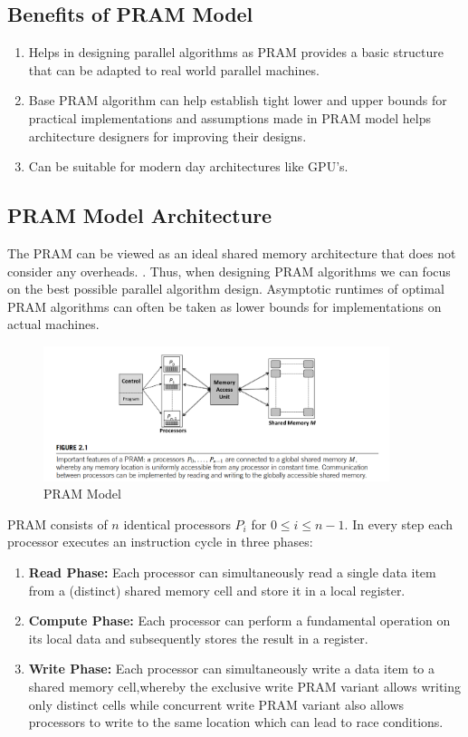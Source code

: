 \subsection*{Benefits of PRAM Model}
\begin{enumerate}
    \item Helps in designing parallel algorithms as PRAM provides a basic structure that can be adapted to real world parallel machines.
    \item Base PRAM algorithm can help establish tight lower and upper bounds for practical implementations and assumptions made in PRAM model helps architecture designers for improving their designs.
    \item Can be suitable for modern day architectures like GPU's.
\end{enumerate}

\newpage

\subsection*{PRAM Model Architecture}
The PRAM can be viewed as an ideal shared memory architecture that does not consider any overheads. . Thus, when designing PRAM algorithms we can focus on the best possible parallel algorithm design. Asymptotic runtimes of optimal PRAM algorithms can often be 
taken as lower bounds for implementations on actual machines.

\begin{figure}[h]
    \centering
    \includegraphics[width=0.9\textwidth]{Images/PRAM.png}
    \caption{PRAM Model}
\end{figure}

PRAM consists of $n$ identical processors $P_i$ for $0 \leq i \leq n-1$. In every step each processor executes an instruction cycle in three phases:
\begin{enumerate}
    \item \textbf{Read Phase:} Each processor can simultaneously read a single data item from a (distinct) shared memory cell and store it in a local register.
    \item \textbf{Compute Phase:} Each processor can perform a fundamental operation on its local data and subsequently stores the result in a register.
    \item \textbf{Write Phase:} Each processor can simultaneously write a data item to a shared memory cell,whereby the exclusive write PRAM variant allows writing only distinct cells while concurrent write PRAM variant also allows processors to write to the same location which can lead to race conditions.
\end{enumerate} 

